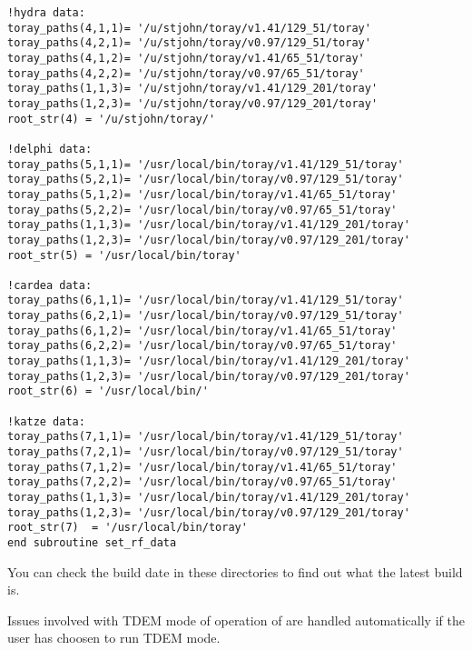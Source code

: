\begin{verbatim}
!hydra data:
toray_paths(4,1,1)= '/u/stjohn/toray/v1.41/129_51/toray'
toray_paths(4,2,1)= '/u/stjohn/toray/v0.97/129_51/toray' 
toray_paths(4,1,2)= '/u/stjohn/toray/v1.41/65_51/toray'
toray_paths(4,2,2)= '/u/stjohn/toray/v0.97/65_51/toray' 
toray_paths(1,1,3)= '/u/stjohn/toray/v1.41/129_201/toray'
toray_paths(1,2,3)= '/u/stjohn/toray/v0.97/129_201/toray' 
root_str(4) = '/u/stjohn/toray/' 

!delphi data:
toray_paths(5,1,1)= '/usr/local/bin/toray/v1.41/129_51/toray'
toray_paths(5,2,1)= '/usr/local/bin/toray/v0.97/129_51/toray' 
toray_paths(5,1,2)= '/usr/local/bin/toray/v1.41/65_51/toray'
toray_paths(5,2,2)= '/usr/local/bin/toray/v0.97/65_51/toray'
toray_paths(1,1,3)= '/usr/local/bin/toray/v1.41/129_201/toray'
toray_paths(1,2,3)= '/usr/local/bin/toray/v0.97/129_201/toray'   
root_str(5) = '/usr/local/bin/toray' 

!cardea data:
toray_paths(6,1,1)= '/usr/local/bin/toray/v1.41/129_51/toray'
toray_paths(6,2,1)= '/usr/local/bin/toray/v0.97/129_51/toray' 
toray_paths(6,1,2)= '/usr/local/bin/toray/v1.41/65_51/toray'
toray_paths(6,2,2)= '/usr/local/bin/toray/v0.97/65_51/toray'
toray_paths(1,1,3)= '/usr/local/bin/toray/v1.41/129_201/toray'
toray_paths(1,2,3)= '/usr/local/bin/toray/v0.97/129_201/toray'  
root_str(6) = '/usr/local/bin/' 

!katze data:
toray_paths(7,1,1)= '/usr/local/bin/toray/v1.41/129_51/toray'
toray_paths(7,2,1)= '/usr/local/bin/toray/v0.97/129_51/toray' 
toray_paths(7,1,2)= '/usr/local/bin/toray/v1.41/65_51/toray'
toray_paths(7,2,2)= '/usr/local/bin/toray/v0.97/65_51/toray'
toray_paths(1,1,3)= '/usr/local/bin/toray/v1.41/129_201/toray'
toray_paths(1,2,3)= '/usr/local/bin/toray/v0.97/129_201/toray'  
root_str(7)  = '/usr/local/bin/toray' 
end subroutine set_rf_data

\end{verbatim}
\normalsize
You can check the build  date in these directories to find out what the latest
build is.

Issues involved with TDEM mode of operation of \ot are handled automatically if
the user has choosen to run  TDEM mode.

